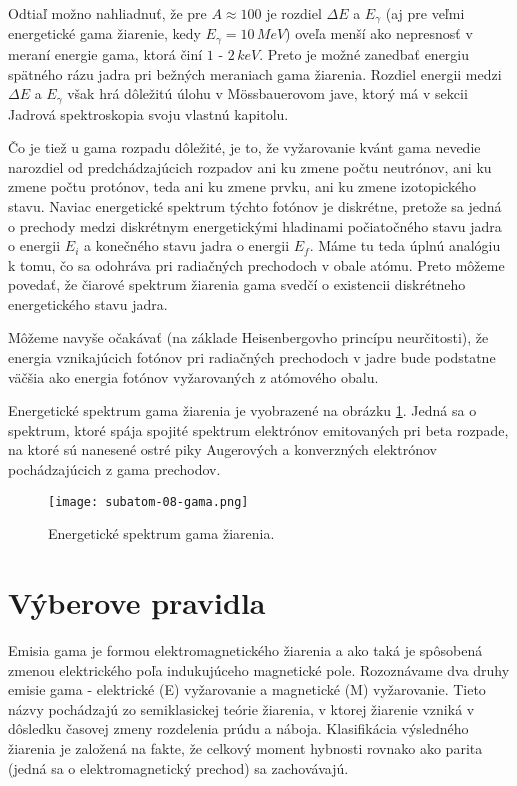 \documentclass[../../main.tex]{subfiles}
\begin{document}
Odtiaľ možno nahliadnuť, že pre $A \approx 100$ je rozdiel $\Delta E$ a $E_{\gamma}$ (aj pre veľmi energetické gama žiarenie, kedy $E_{\gamma} = 10\,\unit{MeV}$) oveľa menší ako nepresnosť v meraní energie gama, ktorá činí $1$ - $2\,\unit{keV}$. Preto je možné zanedbať energiu spätného rázu jadra pri bežných meraniach gama žiarenia. Rozdiel energii medzi $\Delta E$ a $E_{\gamma}$ však hrá dôležitú úlohu v Mössbauerovom jave, ktorý má v sekcii Jadrová spektroskopia svoju vlastnú kapitolu.

Čo je tiež u gama rozpadu dôležité, je to, že vyžarovanie kvánt gama nevedie narozdiel od predchádzajúcich rozpadov ani ku zmene počtu neutrónov, ani ku zmene počtu protónov, teda ani ku zmene prvku, ani ku zmene izotopického stavu. Naviac energetické spektrum týchto fotónov je diskrétne, pretože sa jedná o prechody medzi diskrétnym energetickými hladinami počiatočného stavu jadra o energii $E_i$ a konečného stavu jadra o energii $E_f$. Máme tu teda úplnú analógiu k tomu, čo sa odohráva pri radiačných prechodoch v obale atómu. Preto môžeme povedať, že čiarové spektrum žiarenia gama svedčí o existencii diskrétneho energetického stavu jadra.

Môžeme navyše očakávať (na základe Heisenbergovho princípu neurčitosti), že energia vznikajúcich fotónov pri radiačných prechodoch v jadre bude podstatne väčšia ako energia fotónov vyžarovaných z atómového obalu.

Energetické spektrum gama žiarenia je vyobrazené na obrázku \ref{sf8:fig:gama}. Jedná sa o spektrum, ktoré spája spojité spektrum elektrónov emitovaných pri beta rozpade, na ktoré sú nanesené ostré piky Augerových a konverzných elektrónov pochádzajúcich z gama prechodov.

\begin{figure}[!h]
\texttt{[image: subatom-08-gama.png]}
\centering
\caption{Energetické spektrum gama žiarenia.}
\label{sf8:fig:gama}
\end{figure}

\section{Výberove pravidla}
Emisia gama je formou elektromagnetického žiarenia a ako taká je spôsobená zmenou elektrického poľa indukujúceho magnetické pole. Rozoznávame dva druhy emisie gama - elektrické (E) vyžarovanie a magnetické (M) vyžarovanie. Tieto názvy pochádzajú zo semiklasickej teórie žiarenia, v ktorej žiarenie vzniká v dôsledku časovej zmeny rozdelenia prúdu a náboja.
Klasifikácia výsledného žiarenia je založená na fakte, že celkový moment hybnosti rovnako ako parita (jedná sa o elektromagnetický prechod) sa zachovávajú.
\end{document}
